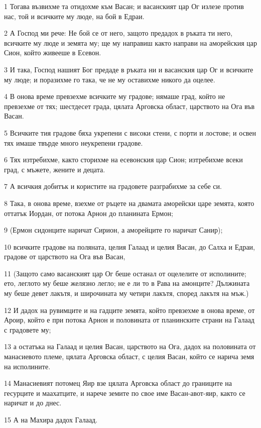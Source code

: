\par 1 Тогава възвихме та отидохме към Васан; и васанският цар Ог излезе против нас, той и всичките му люде, на бой в Едраи.
\par 2 А Господ ми рече: Не бой се от него, защото предадох в ръката ти него, всичките му люде и земята му; ще му направиш както направи на аморейския цар Сион, който живееше в Есевон.
\par 3 И така, Господ нашият Бог предаде в ръката ни и васанския цар Ог и всичките му люде; и поразихме го така, че не му оставихме никого да оцелее.
\par 4 В онова време превзехме всичките му градове; нямаше град, който не превзехме от тях; шестдесет града, цялата Арговска област, царството на Ога във Васан.
\par 5 Всичките тия градове бяха укрепени с високи стени, с порти и лостове; и освен тях имаше твърде много неукрепени градове.
\par 6 Тях изтребихме, както сторихме на есевонския цар Сион; изтребихме всеки град, с мъжете, жените и децата.
\par 7 А всичкия добитък и користите на градовете разграбихме за себе си.
\par 8 Така, в онова време, взехме от ръцете на двамата аморейски царе земята, която оттатък Иордан, от потока Арнон до планината Ермон;
\par 9 (Ермон сидонците наричат Сирион, а аморейците го наричат Санир);
\par 10 всичките градове на поляната, целия Галаад и целия Васан, до Салха и Едраи, градове от царството на Ога във Васан,
\par 11 (Защото само васанският цар Ог беше останал от оцелелите от исполините; ето, леглото му беше желязно легло; не е ли то в Рава на амонците? Дължината му беше девет лакътя, и широчината му четири лакътя, според лакътя на мъж.)
\par 12 И дадох на рувимците и на гадците земята, който превзехме в онова време, от Ароир, който е при потока Арнон и половината от планинските страни на Галаад с градовете му;
\par 13 а остатъка на Галаад и целия Васан, царството на Ога, дадох на половината от манасиевото племе, цялата Арговска област, с целия Васан, който се нарича земя на исполините.
\par 14 Манасиевият потомец Яир взе цялата Арговска област до границите на гесурците и маахатците, и нарече земите по свое име Васан-авот-яир, както се наричат и до днес.
\par 15 А на Махира дадох Галаад.
